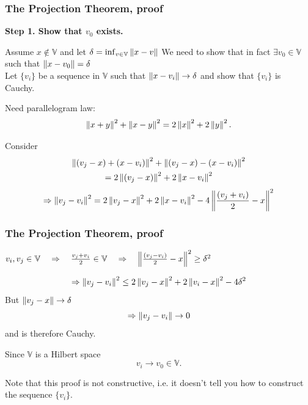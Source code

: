 \documentclass{beamer}
\begin{document}
\begin{frame}\frametitle{The Projection Theorem, proof}

{\bf Step 1.  Show that $v_0$ exists.}

Assume $x \notin \mathbb{V}$ and let $\delta = \inf_{v \in \mathbb{V}} \left\| x - v \right\| $
We need to show that in fact $\exists v_0 \in \mathbb{V}$ such that $\left\| x - v_0 \right\| = \delta$\\

Let $\{v_i\}$ be a sequence in $\mathbb{V}$ such that $\left\| x - v_i \right\| \to \delta $ and show that $\{ v_i \}$ is Cauchy.

\vfill
Need parallelogram law:
\[ 
\left\| x + y \right\|^2 + \left\| x - y \right\|^2 = 2\left\| x \right\|^2 + 2\left\| y \right\|^2.
\]
\vfill

Consider
\begin{multline*}
\left\| (v_j - x) + (x - v_i) \right\|^2 + \left\| (v_j - x) - (x-v_i) \right\|^2 \\
	= 2\left\| (v_j-x) \right\|^2 + 2\left\| x - v_i \right\|^2
\end{multline*}
\[ 
\Rightarrow \left\| v_j - v_i \right\|^2 = 2\left\| v_j - x \right\|^2 + 2\left\| x - v_i \right\|^2 - 4\left\| \frac{(v_j + v_i)}{2} - x \right\|^2
\]

\end{frame}

\begin{frame}\frametitle{The Projection Theorem, proof}
$v_i,v_j \in \mathbb{V} \quad \Rightarrow\quad \frac{v_j+v_i}{2} \in \mathbb{V} \quad\Rightarrow\quad\left\| \frac{(v_j-v_i)}{2} - x \right\|^2 \geq \delta^2$

\[ \Rightarrow \left\| v_j - v_i \right\|^2 \leq 2\left\| v_j - x \right\|^2 + 2\left\| v_i - x \right\|^2 - 4\delta^2 \]
But $\left\| v_j - x \right\| \to \delta$
\[ \Rightarrow \left\| v_j - v_i \right\| \to 0 \] and is therefore Cauchy.

\vfill

Since $\mathbb{V}$ is a Hilbert space
\[ v_i \to v_0 \in \mathbb{V}. \]

\vfill

Note that this proof is not constructive, i.e. it doesn't tell you how to construct the sequence $\{v_i\}$.
\end{frame}
\end{document}
